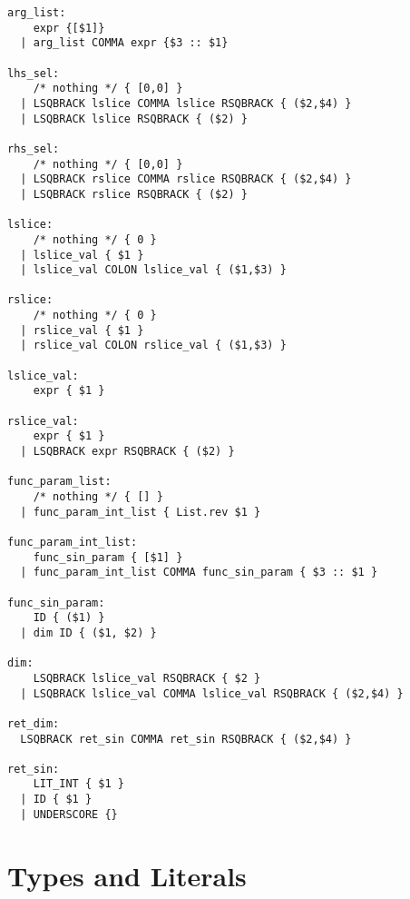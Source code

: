 \begin{verbatim}
arg_list:
    expr {[$1]}
  | arg_list COMMA expr {$3 :: $1}

lhs_sel:
    /* nothing */ { [0,0] }
  | LSQBRACK lslice COMMA lslice RSQBRACK { ($2,$4) }
  | LSQBRACK lslice RSQBRACK { ($2) }

rhs_sel:
    /* nothing */ { [0,0] }
  | LSQBRACK rslice COMMA rslice RSQBRACK { ($2,$4) }
  | LSQBRACK rslice RSQBRACK { ($2) }

lslice:
    /* nothing */ { 0 }
  | lslice_val { $1 }
  | lslice_val COLON lslice_val { ($1,$3) }

rslice:
    /* nothing */ { 0 }
  | rslice_val { $1 }
  | rslice_val COLON rslice_val { ($1,$3) }

lslice_val:
    expr { $1 }

rslice_val:
    expr { $1 }
  | LSQBRACK expr RSQBRACK { ($2) }

func_param_list:
    /* nothing */ { [] }
  | func_param_int_list { List.rev $1 }

func_param_int_list:
    func_sin_param { [$1] }
  | func_param_int_list COMMA func_sin_param { $3 :: $1 }

func_sin_param:
    ID { ($1) }
  | dim ID { ($1, $2) }

dim:
    LSQBRACK lslice_val RSQBRACK { $2 }
  | LSQBRACK lslice_val COMMA lslice_val RSQBRACK { ($2,$4) }

ret_dim:
  LSQBRACK ret_sin COMMA ret_sin RSQBRACK { ($2,$4) }

ret_sin:
    LIT_INT { $1 }
  | ID { $1 }
  | UNDERSCORE {}
\end{verbatim}
\section{Types and Literals}
